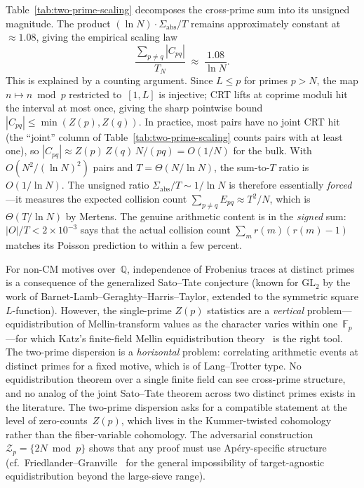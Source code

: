 \documentclass[11pt]{article}
\theoremstyle{definition}
\theoremstyle{remark}
\begin{document}
\noindent
Table~\ref{tab:two-prime-scaling}
decomposes the cross-prime sum
into its unsigned magnitude.
The product
$(\ln N) \cdot \Sigma_{\mathrm{abs}}/T$
remains approximately constant
at~$\approx 1.08$, giving the
empirical scaling law
\[
\frac{\sum_{p \ne q} |C_{pq}|}{T_N}
\;\approx\;
\frac{1.08}{\ln N}.
\]
This is explained by a counting argument.
Since $L \le p$ for primes $p > N$,
the map $n \mapsto n \bmod p$ restricted
to~$[1, L]$ is injective; CRT lifts at
coprime moduli hit the interval at
most once, giving the sharp pointwise bound
$|C_{pq}| \le \min(Z(p), Z(q))$.
In practice, most pairs have no joint
CRT hit (the ``joint'' column of
Table~\ref{tab:two-prime-scaling}
counts pairs with at least one),
so $|C_{pq}| \approx Z(p)\,Z(q)\,N/(pq)
= O(1/N)$ for the bulk.
With $O(N^2/(\ln N)^2)$ pairs and
$T = \Theta(N/\ln N)$, the sum-to-$T$
ratio is~$O(1/\ln N)$.
The unsigned ratio $\Sigma_{\mathrm{abs}}/T
\sim 1/\!\ln N$ is therefore essentially
\emph{forced}---it measures the expected
collision count $\sum_{p \ne q}
E_{pq} \approx T^2/N$,
which is $\Theta(T/\!\ln N)$ by Mertens.
The genuine arithmetic content is in
the \emph{signed} sum: $|O|/T < 2 \times 10^{-3}$
says that the actual collision count
$\sum_m r(m)(r(m){-}1)$ matches its
Poisson prediction to within a few percent.

For non-CM motives over~$\mathbb{Q}$,
independence of Frobenius traces at
distinct primes is a consequence of
the generalized Sato--Tate conjecture
(known for $\mathrm{GL}_2$ by the
work of Barnet-Lamb--Geraghty--Harris--Taylor,
extended to the symmetric square
$L$-function).
However, the single-prime $Z(p)$
statistics are a \emph{vertical}
problem---equidistribution of
Mellin-transform values as the
character varies within one~$\mathbb{F}_p$---for
which Katz's finite-field Mellin
equidistribution theory~\cite{Katz2012}
is the right tool.
The two-prime dispersion is a
\emph{horizontal} problem:
correlating arithmetic events at
distinct primes for a fixed motive,
which is of Lang--Trotter type.
No equidistribution theorem over a
single finite field can see cross-prime
structure, and no analog of the joint
Sato--Tate theorem across two distinct
primes exists in the literature.
The two-prime dispersion asks for a
compatible statement at the level of
zero-counts~$Z(p)$, which lives in the
Kummer-twisted cohomology rather than
the fiber-variable cohomology.
The adversarial construction
$\mathcal{Z}_p = \{2N \bmod p\}$
shows that any proof must use
Ap\'ery-specific structure
(cf.~Friedlander--Granville~\cite{FG1989}
for the general impossibility of
target-agnostic equidistribution beyond
the large-sieve range).
\end{document}
